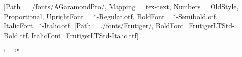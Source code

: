 \usepackage{tocloft}
\setlength{\cftbeforepartskip}{5.0mm}
\setlength{\cftbeforechapskip}{2.0mm}
\setlength{\cftbeforesecskip}{0.0mm}

\usepackage{pageslts}

\usepackage{ifxetex}

\ifxetex
	\usepackage{mathspec}
	\usepackage[no-math]{fontspec}
	\usepackage{xunicode}
	\usepackage{xltxtra}
    \usepackage[Adobe Garamond]{mathdesign}
	\setmainfont{AGaramondPro}[Path = ./fonts/AGaramondPro/, Mapping = tex-text, Numbers = {OldStyle, Proportional}, UprightFont = *-Regular.otf, BoldFont= *-Semibold.otf, ItalicFont=*-Italic.otf]
	\setsansfont{FrutigerLTStd-Roman.ttf}[Path = ./fonts/Frutiger/, BoldFont=FrutigerLTStd-Bold.ttf, ItalicFont=FrutigerLTStd-Italic.ttf]
	
	\usepackage{etoolbox}
	\makeatletter
	\begingroup\lccode`~=`"
	\lowercase{\endgroup
	  \everymath{\let~\eu@active@quote}
	  \everydisplay{\let~\eu@active@quote}
	}
	\makeatother
\else
	 \usepackage[utf8]{inputenc}
\fi

